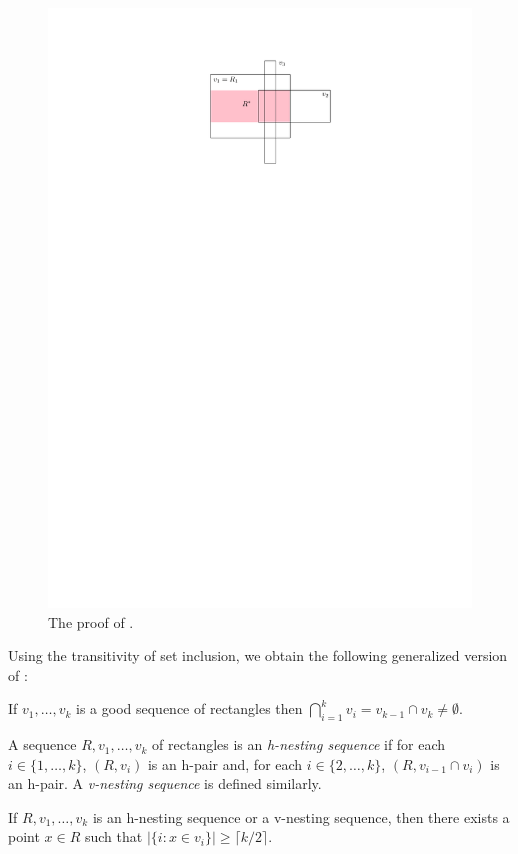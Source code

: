 \documentclass[lotsofwhite]{patmorin}
\begin{document}
\begin{figure}
  \begin{center}
    \includegraphics{figs/geometric}
  \end{center}
  \caption{The proof of .}
\end{figure}


Using the transitivity of set inclusion, we obtain the following generalized
version of :

\begin{cor}
  If $v_1,\ldots,v_k$ is a good sequence of rectangles then 
  $\bigcap_{i=1}^{k} v_i = v_{k-1}\cap v_k \neq \emptyset$.
\end{cor}

A sequence $R,v_1,\ldots,v_k$ of rectangles is an \emph{h-nesting
sequence} if for each $i\in\{1,\ldots,k\}$, $(R,v_i)$ is an h-pair and,
for each $i\in\{2,\ldots,k\}$, $(R,v_{i-1}\cap v_i)$ is an h-pair.
A \emph{v-nesting sequence} is defined
similarly.
\begin{lem}
   If $R,v_1,\ldots,v_k$ is an h-nesting sequence or a v-nesting sequence,
   then there exists a point $x\in R$ such that $|\{ i: x\in v_i \}|\ge
   \lceil k/2\rceil$.
\end{lem}
\end{document}
